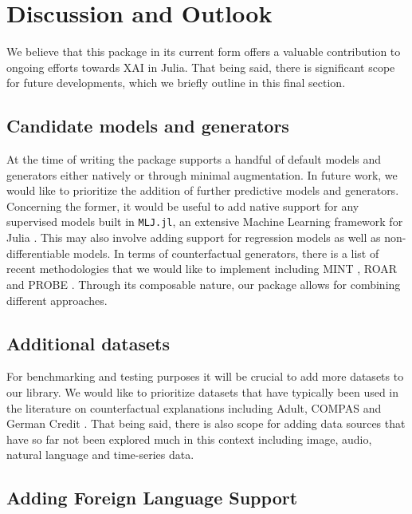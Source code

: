 \documentclass{juliacon}
\begin{document}
\hypertarget{sec-outlook}{%
\section{Discussion and Outlook}\label{sec-outlook}}

We believe that this package in its current form offers a valuable
contribution to ongoing efforts towards XAI in Julia. That being said,
there is significant scope for future developments, which we briefly
outline in this final section.

\hypertarget{candidate-models-and-generators}{%
\subsection{Candidate models and
generators}\label{candidate-models-and-generators}}

At the time of writing the package supports a handful of default models
and generators either natively or through minimal augmentation. In
future work, we would like to prioritize the addition of further
predictive models and generators. Concerning the former, it would be
useful to add native support for any supervised models built in
\texttt{MLJ.jl}, an extensive Machine Learning framework for Julia
\cite{blaom2020mlj}. This may also involve adding support for regression
models as well as non-differentiable models. In terms of counterfactual
generators, there is a list of recent methodologies that we would like
to implement including MINT \cite{karimi2021algorithmic}, ROAR
\cite{upadhyay2021robust} and PROBE
\cite{pawelczyk2022probabilistically}. Through its composable nature,
our package allows for combining different approaches.

\hypertarget{additional-datasets}{%
\subsection{Additional datasets}\label{additional-datasets}}

For benchmarking and testing purposes it will be crucial to add more
datasets to our library. We would like to prioritize datasets that have
typically been used in the literature on counterfactual explanations
including Adult, COMPAS and German Credit \cite{karimi2020survey}. That
being said, there is also scope for adding data sources that have so far
not been explored much in this context including image, audio, natural
language and time-series data.

\hypertarget{sec-dis-foreign}{%
\subsection{Adding Foreign Language Support}\label{sec-dis-foreign}}
\end{document}
